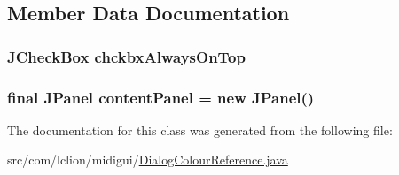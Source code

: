 \subsection{Member Data Documentation}
\hypertarget{classcom_1_1lclion_1_1midigui_1_1_dialog_colour_reference_afb212360a6ff5330b0ca37ea40c372a8}{
\subsubsection[{chckbx\+Always\+On\+Top}]{\setlength{\rightskip}{0pt plus 5cm}J\+Check\+Box chckbx\+Always\+On\+Top\hspace{0.3cm}{\ttfamily [private]}}}\label{classcom_1_1lclion_1_1midigui_1_1_dialog_colour_reference_afb212360a6ff5330b0ca37ea40c372a8}
\hypertarget{classcom_1_1lclion_1_1midigui_1_1_dialog_colour_reference_ac383c7b38c74b9e1cc245a00de4fbb5e}{
\subsubsection[{content\+Panel}]{\setlength{\rightskip}{0pt plus 5cm}final J\+Panel content\+Panel = new J\+Panel()\hspace{0.3cm}{\ttfamily [private]}}}\label{classcom_1_1lclion_1_1midigui_1_1_dialog_colour_reference_ac383c7b38c74b9e1cc245a00de4fbb5e}


The documentation for this class was generated from the following file\+:\begin{DoxyCompactItemize}
\item 
src/com/lclion/midigui/\hyperlink{_dialog_colour_reference_8java}{Dialog\+Colour\+Reference.\+java}\end{DoxyCompactItemize}
